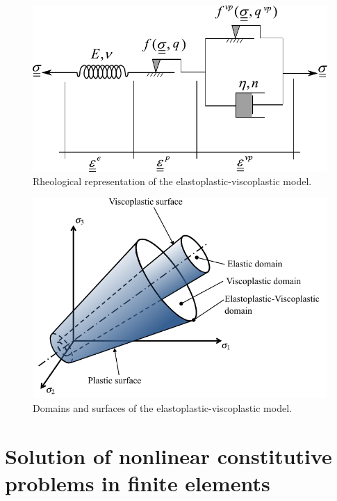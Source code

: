\documentclass[Journal,letterpaper]{ascelike-new}
\begin{document}
\begin{figure}
	\centering
	\includegraphics[scale=1]{reological_scheme.pdf}
	\caption{Rheological representation of the elastoplastic-viscoplastic model.}
	\label{reological_scheme}
\end{figure}
\begin{figure}
	\centering
	\includegraphics[scale=1]{surfaces_epvp.pdf}
	\caption{Domains and surfaces of the elastoplastic-viscoplastic model.}
	\label{surfaces_epvp}
\end{figure}

\section{Solution of nonlinear constitutive problems in finite elements}
\end{document}

